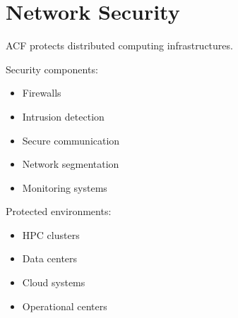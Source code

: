 \section{Network Security}


ACF protects distributed computing infrastructures.



Security components:


\begin{itemize}

\item Firewalls

\item Intrusion detection

\item Secure communication

\item Network segmentation

\item Monitoring systems

\end{itemize}



Protected environments:


\begin{itemize}

\item HPC clusters

\item Data centers

\item Cloud systems

\item Operational centers

\end{itemize}
